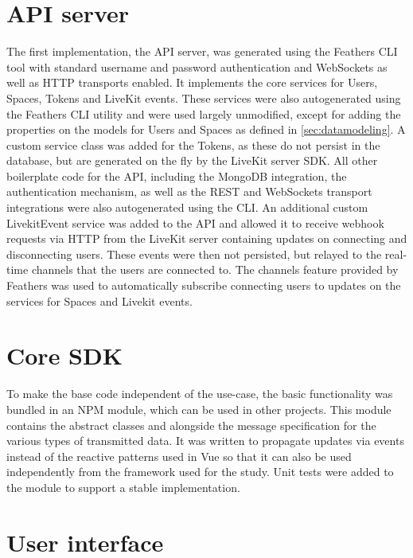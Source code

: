 \section{API server}

The first implementation, the \ac{API} server, was generated using the Feathers \ac{CLI} tool with standard username and password authentication and WebSockets as well as HTTP transports enabled.
It implements the core services for Users, Spaces, Tokens and LiveKit events.
These services were also autogenerated using the Feathers \ac{CLI} utility and were used largely unmodified, except for adding the properties on the models for Users and Spaces as defined in \autoref{sec:datamodeling}.
A custom service class was added for the Tokens, as these do not persist in the database, but are generated on the fly by the LiveKit server \ac{SDK}.
All other boilerplate code for the \ac{API}, including the MongoDB integration, the authentication mechanism, as well as the REST and WebSockets transport integrations were also autogenerated using the \ac{CLI}.
An additional custom LivekitEvent service was added to the API and allowed it to receive webhook requests via HTTP from the LiveKit server containing updates on connecting and disconnecting users.
These events were then not persisted, but relayed to the real-time channels that the users are connected to.
The channels feature provided by Feathers was used to automatically subscribe connecting users to updates on the services for Spaces and Livekit events.

\section{Core SDK}

To make the base code independent of the use-case, the basic functionality was bundled in an \ac{NPM} module, which can be used in other projects.
This module contains the abstract classes  and  alongside the message specification for the various types of transmitted data.
It was written to propagate updates via events instead of the reactive patterns used in Vue so that it can also be used independently from the framework used for the study.
Unit tests were added to the module to support a stable implementation.

\section{User interface}

